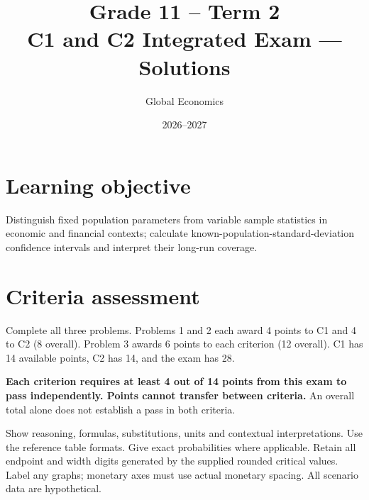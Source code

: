 \newcommand{\cTwoB}{For each requested confidence level, tabulate the initial point estimate, margin of error, separate endpoints, confidence interval and full width using the known population standard deviation.}
\newcommand{\cTwoC}{For subsequent studies only, calculate covering counts, observed coverage and absolute differences from nominal confidence (percentage points), including endpoint equality. Explain long-run coverage and finite-study variation; distinguish coverage from sample means inside the initial interval and from probability assigned to a fixed mean after calculation.}
\title{Grade 11 -- Term 2\\C1 and C2 Integrated Exam --- Solutions}
\author{Global Economics}
\date{2026--2027}

\maketitle
\setcounter{tocdepth}{1}
\label{toc}\tableofcontents
\section*{Learning objective}
Distinguish fixed population parameters from variable sample statistics in economic and financial contexts; calculate known-population-standard-deviation confidence intervals and interpret their long-run coverage.
\section*{Criteria assessment}
Complete all three problems. Problems 1 and 2 each award 4 points to C1 and 4 to C2 (8 overall). Problem 3 awards 6 points to each criterion (12 overall). C1 has 14 available points, C2 has 14, and the exam has 28.

\textbf{Each criterion requires at least 4 out of 14 points from this exam to pass independently. Points cannot transfer between criteria.} An overall total alone does not establish a pass in both criteria.

Show reasoning, formulas, substitutions, units and contextual interpretations. Use the reference table formats. Give exact probabilities where applicable. Retain all endpoint and width digits generated by the supplied rounded critical values. Label any graphs; monetary axes must use actual monetary spacing. All scenario data are hypothetical.
